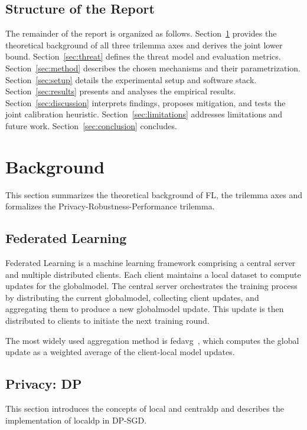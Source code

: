 \documentclass[11pt,twocolumn,a4paper,DIV=calc,parskip=half]{scrartcl}
\begin{document}
	\subsection{Structure of the Report}
	
	The remainder of the report is organized as follows.
	Section~\ref{sec:background} provides the theoretical background of all three
	trilemma axes and derives the joint lower bound.
	Section~\ref{sec:threat} defines the threat model and evaluation metrics.
	Section~\ref{sec:method} describes the chosen mechanisms and their
	parametrization.
	Section~\ref{sec:setup} details the experimental setup and software stack.
	Section~\ref{sec:results} presents and analyses the empirical results.
	Section~\ref{sec:discussion} interprets findings, proposes mitigation, and tests
	the joint calibration heuristic.
	Section~\ref{sec:limitations} addresses limitations and future work.
	Section~\ref{sec:conclusion} concludes.
	
	\section{Background}
	\label{sec:background}
	This section summarizes the theoretical background of \ac{FL}, the trilemma axes and formalizes the Privacy-Robustness-Performance trilemma.
	\subsection{Federated Learning}
	
	Federated Learning is a machine learning framework comprising a central server and multiple distributed clients. Each client maintains a
	local dataset to compute updates for the \gls{globalmodel}. The central server orchestrates the training process by distributing the current
	\gls{globalmodel}, collecting client updates, and aggregating them to produce a new \gls{globalmodel} update. This update is then distributed to clients to initiate the next training round. 
	
	The most widely used aggregation method is \gls{fedavg}~\cite{mcmahan2017fedavg}, which computes
	the global update as a weighted average of the client-local model updates.
	
	\subsection{Privacy: \ac{DP}}
	This section introduces the concepts of local and \gls{centraldp} and describes the implementation of \gls{localdp} in \ac{DP-SGD}.
	
\end{document}
